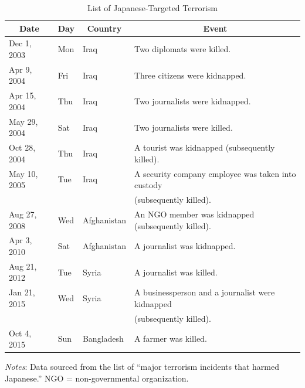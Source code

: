 \documentclass[12pt,letterpaper]{scrartcl}
\begin{document}
\begin{table}[H]
\begin{minipage}{\hsize}
\centering
\small
\singlespacing
\caption{List of Japanese-Targeted Terrorism}
\label{list_Japanese_targeted_terrorism}
\bigskip
\begin{tabular}{llll}\toprule
\multicolumn{1}{c}{Date} & \multicolumn{1}{c}{Day}& \multicolumn{1}{c}{Country} & \multicolumn{1}{c}{Event} \\\midrule
Dec 1, 2003 & Mon & Iraq & Two diplomats were killed. \\
Apr 9, 2004 & Fri & Iraq & Three citizens were kidnapped. \\
Apr 15, 2004 & Thu & Iraq & Two journalists were kidnapped. \\
May 29, 2004 & Sat & Iraq & Two journalists were killed. \\
Oct 28, 2004 & Thu & Iraq & A tourist was kidnapped (subsequently killed). \\
May 10, 2005 & Tue & Iraq & A security company employee was taken into custody \\
 & & & (subsequently killed). \\
Aug 27, 2008 & Wed & Afghanistan & An NGO member was kidnapped (subsequently killed). \\
Apr 3, 2010 & Sat & Afghanistan & A journalist was kidnapped. \\
Aug 21, 2012 & Tue & Syria & A journalist was killed. \\
Jan 21, 2015 & Wed & Syria & A businessperson and a journalist were kidnapped \\
 & & & (subsequently killed). \\
Oct 4, 2015 & Sun & Bangladesh & A farmer was killed. \\\bottomrule
\end{tabular}
\end{minipage}
\centering
\begin{minipage}{\hsize}
\bigskip
\small
\singlespacing
\emph{Notes}: Data sourced from the  \citeyearpar{PCIA2023} list of ``major terrorism incidents that harmed Japanese.'' NGO = non-governmental organization.
\end{minipage}
\end{table}
\end{document}
